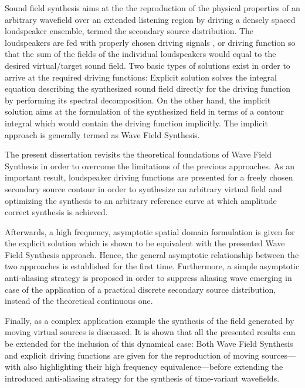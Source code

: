Sound field synthesis aims at the the reproduction of the physical properties of an arbitrary wavefield over an extended listening region by driving a densely spaced loudspeaker ensemble, termed the secondary source distribution.
The loudspeakers are fed with properly chosen driving signals , or driving function so that the sum of the fields of the individual loudspeakers would equal to the desired virtual/target sound field.
Two basic types of solutions exist in order to arrive at the required driving functions:
Explicit solution solves the integral equation describing the synthesized sound field directly for the driving function by performing its spectral decomposition.
On the other hand, the implicit solution aims at the formulation of the synthesized field in terms of a contour integral which would contain the driving function implicitly.
The implicit approach is generally termed as Wave Field Synthesis.

The present dissertation revisits the theoretical foundations of Wave Field Synthesis in order to overcome the limitations of the previous approaches.
As an important result, loudspeaker driving functions are presented for a freely chosen secondary source contour in order to synthesize an arbitrary virtual field and optimizing the synthesis to an arbitrary reference curve at which amplitude correct synthesis is achieved.

Afterwards, a high frequency, asymptotic spatial domain formulation is given for the explicit solution which is shown to be equivalent with the presented Wave Field Synthesis approach.
Hence, the general asymptotic relationship between the two approaches is established for the first time.
Furthermore, a simple asymptotic anti-aliasing strategy is proposed in order to suppress aliasing wave emerging in case of the application of a practical discrete secondary source distribution, instead of the theoretical continuous one.

Finally, as a complex application example the synthesis of the field generated by moving virtual sources is discussed.
It is shown that all the presented results can be extended for the inclusion of this dynamical case: 
Both Wave Field Synthesis and explicit driving functions are given for the reproduction of moving sources---with also highlighting their high frequency equivalence---before extending the introduced anti-aliasing strategy for the synthesis of time-variant wavefields.


%

